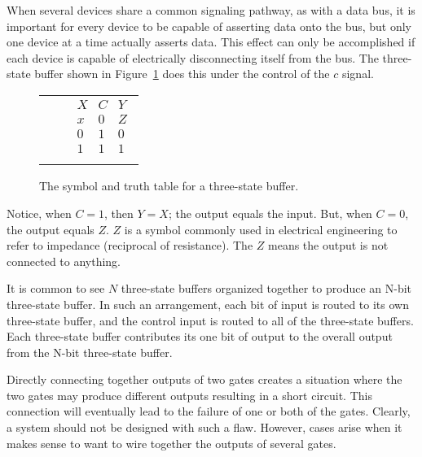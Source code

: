             When several devices share a common signaling pathway, as with
            a data bus, it is important for every device to be capable of
            asserting data onto the bus, but only one device at a time
            actually asserts data.  This effect can only be accomplished if each
            device is capable of electrically disconnecting itself from the
            bus.  The three-state buffer shown in Figure~\ref{fig:comboBBtsb} does
            this under the control of the $c$ signal.

            \begin{figure}[ht]
                \begin{tabular}[b]{p{1.0in}p{0.5in}l}
                    \includegraphics[10mm,10mm][12mm,12mm]{tsb} & &

                    $
                    \begin{array}{c|c||c}
                        X & C & Y \\ \hline
                        x & 0 & Z \\ \hline
                        0 & 1 & 0 \\ \hline
                        1 & 1 & 1 \\
                    \end{array}$
                \end{tabular}
                \caption{The symbol and truth table for a three-state buffer.}
                \label{fig:comboBBtsb}
            \end{figure}

            Notice, when $C=1$, then $Y=X$; the output equals the
            input.  But, when $C=0$, the output equals $Z$.  $Z$ is
            a symbol commonly used in electrical engineering
            to refer to impedance (reciprocal of resistance).  The
            $Z$ means the output is not connected to anything.

            It is common to see $N$ three-state buffers organized together to
            produce an N-bit three-state buffer.  In such an arrangement,
            each bit of input is routed to its own three-state buffer,
            and the control input is routed to all of the three-state
            buffers.  Each three-state buffer contributes its one bit
            of output to the overall output from the N-bit three-state
            buffer.

            Directly connecting together outputs of two gates creates
            a situation where the two gates may produce different outputs
            resulting in a short circuit.  This connection will
            eventually lead to the failure of one or both of the gates.
            Clearly, a system should not be designed with such a flaw.
            However, cases arise when it makes sense to want to wire
            together the outputs of several gates.


